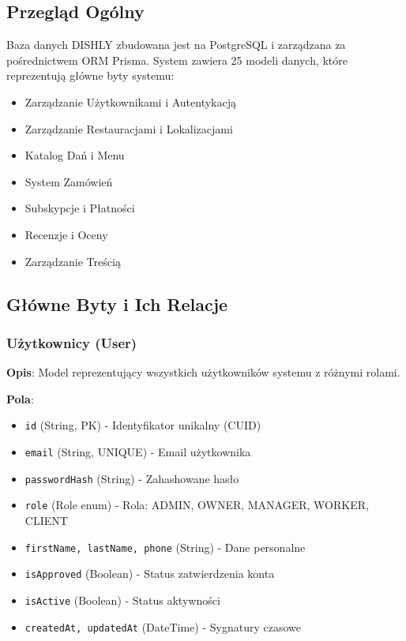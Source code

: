 \documentclass[12pt,a4paper,utf-8]{article}
\begin{document}
\subsection{Przegląd Ogólny}

Baza danych DISHLY zbudowana jest na PostgreSQL i zarządzana za pośrednictwem ORM Prisma. System zawiera 25 modeli danych, które reprezentują główne byty systemu:

\begin{itemize}
    \item Zarządzanie Użytkownikami i Autentykacją
    \item Zarządzanie Restauracjami i Lokalizacjami
    \item Katalog Dań i Menu
    \item System Zamówień
    \item Subskypcje i Płatności
    \item Recenzje i Oceny
    \item Zarządzanie Treścią
\end{itemize}

\subsection{Główne Byty i Ich Relacje}

\subsubsection{Użytkownicy (User)}

\textbf{Opis}: Model reprezentujący wszystkich użytkowników systemu z różnymi rolami.

\textbf{Pola}:
\begin{itemize}
    \item \texttt{id} (String, PK) - Identyfikator unikalny (CUID)
    \item \texttt{email} (String, UNIQUE) - Email użytkownika
    \item \texttt{passwordHash} (String) - Zahashowane hasło
    \item \texttt{role} (Role enum) - Rola: ADMIN, OWNER, MANAGER, WORKER, CLIENT
    \item \texttt{firstName, lastName, phone} (String) - Dane personalne
    \item \texttt{isApproved} (Boolean) - Status zatwierdzenia konta
    \item \texttt{isActive} (Boolean) - Status aktywności
    \item \texttt{createdAt, updatedAt} (DateTime) - Sygnatury czasowe
\end{itemize}
\end{document}
